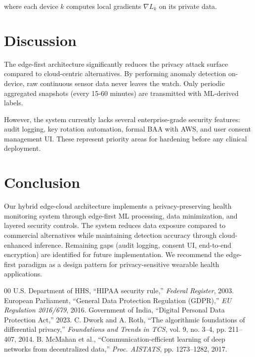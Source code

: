 \documentclass[conference]{IEEEtran}
\begin{document}
where each device $k$ computes local gradients $\nabla L_k$ on its private data.

\section{Discussion}
The edge-first architecture significantly reduces the privacy attack surface compared to cloud-centric alternatives. By performing anomaly detection on-device, raw continuous sensor data never leaves the watch. Only periodic aggregated snapshots (every 15-60 minutes) are transmitted with ML-derived labels.

However, the system currently lacks several enterprise-grade security features: audit logging, key rotation automation, formal BAA with AWS, and user consent management UI. These represent priority areas for hardening before any clinical deployment.

\section{Conclusion}
Our hybrid edge-cloud architecture implements a privacy-preserving health monitoring system through edge-first ML processing, data minimization, and layered security controls. The system reduces data exposure compared to commercial alternatives while maintaining detection accuracy through cloud-enhanced inference. Remaining gaps (audit logging, consent UI, end-to-end encryption) are identified for future implementation. We recommend the edge-first paradigm as a design pattern for privacy-sensitive wearable health applications.

\begin{thebibliography}{00}
 U.S. Department of HHS, ``HIPAA security rule,'' \textit{Federal Register}, 2003.
 European Parliament, ``General Data Protection Regulation (GDPR),'' \textit{EU Regulation 2016/679}, 2016.
 Government of India, ``Digital Personal Data Protection Act,'' 2023.
 C. Dwork and A. Roth, ``The algorithmic foundations of differential privacy,'' \textit{Foundations and Trends in TCS}, vol. 9, no. 3--4, pp. 211--407, 2014.
 B. McMahan et al., ``Communication-efficient learning of deep networks from decentralized data,'' \textit{Proc. AISTATS}, pp. 1273--1282, 2017.
\end{thebibliography}
\end{document}
